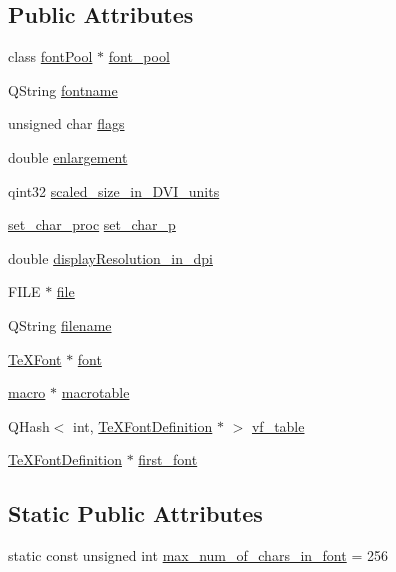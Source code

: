 \subsection*{Public Attributes}
\begin{DoxyCompactItemize}
\item 
class \hyperlink{classfontPool}{font\+Pool} $\ast$ \hyperlink{classTeXFontDefinition_abc8dfc7c07e8d998150e4ab09f9f9bec}{font\+\_\+pool}
\item 
Q\+String \hyperlink{classTeXFontDefinition_a9f1c42427054d44e3a5f110230858c03}{fontname}
\item 
unsigned char \hyperlink{classTeXFontDefinition_ad381057cceb9b78816df47e27c771d1e}{flags}
\item 
double \hyperlink{classTeXFontDefinition_ad49309e518eb93ef852667ccc2b324f3}{enlargement}
\item 
qint32 \hyperlink{classTeXFontDefinition_a8514a1b74d448c5e9e9dafc8737938e9}{scaled\+\_\+size\+\_\+in\+\_\+\+D\+V\+I\+\_\+units}
\item 
\hyperlink{TeXFontDefinition_8h_a8c8fccd597b068130979c5ec1e66486c}{set\+\_\+char\+\_\+proc} \hyperlink{classTeXFontDefinition_a2901636eeb7920b42396cdbdd3f93774}{set\+\_\+char\+\_\+p}
\item 
double \hyperlink{classTeXFontDefinition_a08e27df7d9764c43308c5637906658c5}{display\+Resolution\+\_\+in\+\_\+dpi}
\item 
F\+I\+L\+E $\ast$ \hyperlink{classTeXFontDefinition_a5899cf41fd48fee065d13848ce3b81a8}{file}
\item 
Q\+String \hyperlink{classTeXFontDefinition_a28d5b98d97711686c6bc0e8df3bc9cc6}{filename}
\item 
\hyperlink{classTeXFont}{Te\+X\+Font} $\ast$ \hyperlink{classTeXFontDefinition_a3e788e09d8978795672226b472163b4f}{font}
\item 
\hyperlink{classmacro}{macro} $\ast$ \hyperlink{classTeXFontDefinition_a03a3d2e16fb85e0847243aec5671c724}{macrotable}
\item 
Q\+Hash$<$ int, \hyperlink{classTeXFontDefinition}{Te\+X\+Font\+Definition} $\ast$ $>$ \hyperlink{classTeXFontDefinition_a5cbb8fb4966c6f2488053eb7b4abbfed}{vf\+\_\+table}
\item 
\hyperlink{classTeXFontDefinition}{Te\+X\+Font\+Definition} $\ast$ \hyperlink{classTeXFontDefinition_ab6e60134247487e543a17590bf5ed774}{first\+\_\+font}
\end{DoxyCompactItemize}
\subsection*{Static Public Attributes}
\begin{DoxyCompactItemize}
\item 
static const unsigned int \hyperlink{classTeXFontDefinition_a542c448736e5c591257ac3889f047d66}{max\+\_\+num\+\_\+of\+\_\+chars\+\_\+in\+\_\+font} = 256
\end{DoxyCompactItemize}


